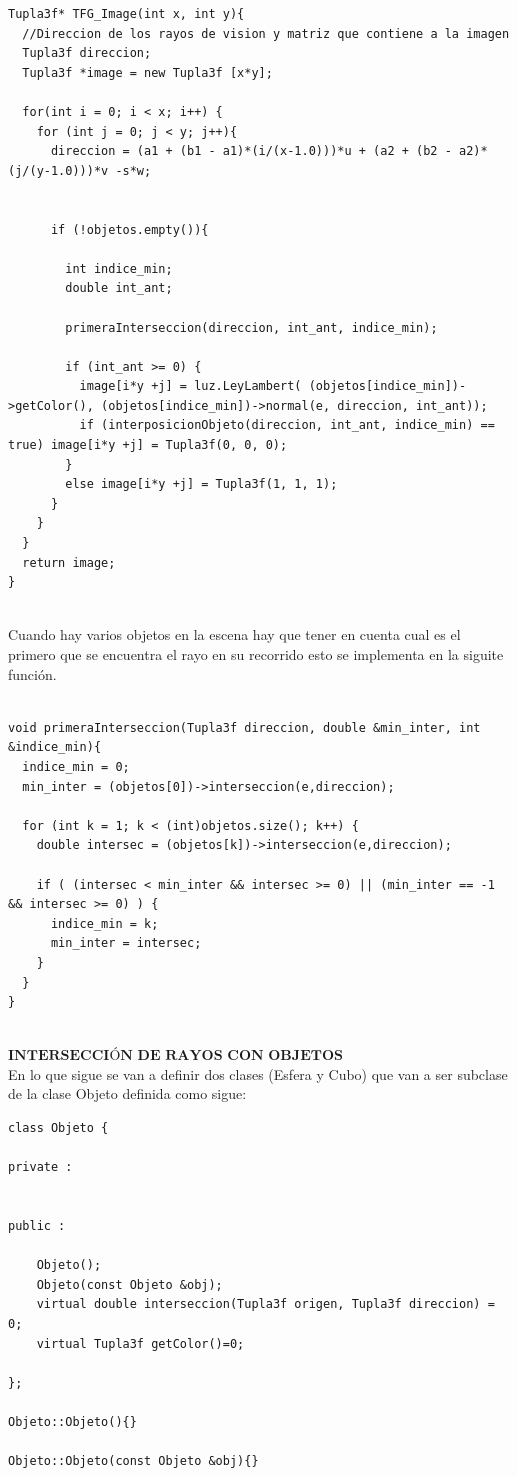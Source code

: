 \begin{lstlisting}[style=Consola]
Tupla3f* TFG_Image(int x, int y){
  //Direccion de los rayos de vision y matriz que contiene a la imagen
  Tupla3f direccion;
  Tupla3f *image = new Tupla3f [x*y];

  for(int i = 0; i < x; i++) {
    for (int j = 0; j < y; j++){
      direccion = (a1 + (b1 - a1)*(i/(x-1.0)))*u + (a2 + (b2 - a2)*(j/(y-1.0)))*v -s*w;


      if (!objetos.empty()){

        int indice_min;
        double int_ant;

        primeraInterseccion(direccion, int_ant, indice_min);

        if (int_ant >= 0) {
          image[i*y +j] = luz.LeyLambert( (objetos[indice_min])->getColor(), (objetos[indice_min])->normal(e, direccion, int_ant));
          if (interposicionObjeto(direccion, int_ant, indice_min) == true) image[i*y +j] = Tupla3f(0, 0, 0);
        }	
        else image[i*y +j] = Tupla3f(1, 1, 1);
      }
    }
  }
  return image;
}

\end{lstlisting}
${ }$\\

Cuando hay varios objetos en la escena hay que tener en cuenta cual es el primero que se encuentra el rayo en su recorrido esto se implementa en la siguite función.

\begin{lstlisting}[style=Consola]

void primeraInterseccion(Tupla3f direccion, double &min_inter, int &indice_min){
  indice_min = 0;
  min_inter = (objetos[0])->interseccion(e,direccion);

  for (int k = 1; k < (int)objetos.size(); k++) {
    double intersec = (objetos[k])->interseccion(e,direccion);

    if ( (intersec < min_inter && intersec >= 0) || (min_inter == -1 && intersec >= 0) ) {
      indice_min = k;
      min_inter = intersec;
    }
  }
}

\end{lstlisting}

${ }$\\
$\textbf{INTERSECCIÓN DE RAYOS CON OBJETOS}$
${ }$\\

En lo que sigue se van a definir dos clases (Esfera y Cubo) que van a ser subclase de la clase Objeto definida como sigue:

\begin{lstlisting}[style=Consola]
class Objeto {

private :


public :

	Objeto();
	Objeto(const Objeto &obj);
	virtual double interseccion(Tupla3f origen, Tupla3f direccion) = 0;
	virtual Tupla3f getColor()=0;

};

Objeto::Objeto(){}

Objeto::Objeto(const Objeto &obj){}
\end{lstlisting}

